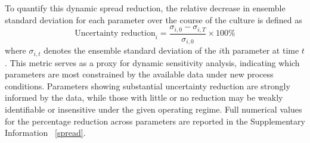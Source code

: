 To quantify this dynamic spread reduction, the relative decrease in ensemble standard deviation for each parameter over the course of the culture is defined as
\begin{equation}
\text{Uncertainty reduction}_i = \frac{\sigma_{i,0} - \sigma_{i,T}}{\sigma_{i,0}} \times 100\%
\label{eq:parameter_uncertainty_reduction}
\end{equation}
where $\sigma_{i,t}$ denotes the ensemble standard deviation of the $i$th parameter at time $t$. This metric serves as a proxy for dynamic sensitivity analysis, indicating which parameters are most constrained by the available data under new process conditions. Parameters showing substantial uncertainty reduction are strongly informed by the data, while those with little or no reduction may be weakly identifiable or insensitive under the given operating regime. Full numerical values for the percentage reduction across parameters are reported in the Supplementary Information ~\ref{spread}.
